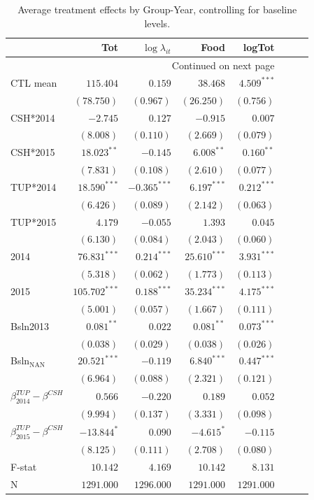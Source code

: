 \documentclass[12pt,article]{article}
\begin{document}
\newpage

\begin{longtable}{lrrrrrrr}
\caption{\label{tab:consumption}Average treatment effects by Group-Year, controlling for baseline levels.}
\\
\hline
 & Tot & $\log\lambda_{it}$ & Food & logTot\\
\hline
\endhead
\hline\multicolumn{5}{r}{Continued on next page} \\
\endfoot
\endlastfoot
CTL mean & $115.404$ & $0.159$ & $38.468$ & $4.509^{***}$\\
 & $(78.750)$ & $(0.967)$ & $(26.250)$ & $(0.756)$\\
\hline
CSH*2014 & $-2.745$ & $0.127$ & $-0.915$ & $0.007$\\
 & $(8.008)$ & $(0.110)$ & $(2.669)$ & $(0.079)$\\
CSH*2015 & $18.023^{**}$ & $-0.145$ & $6.008^{**}$ & $0.160^{**}$\\
 & $(7.831)$ & $(0.108)$ & $(2.610)$ & $(0.077)$\\
TUP*2014 & $18.590^{***}$ & $-0.365^{***}$ & $6.197^{***}$ & $0.212^{***}$\\
 & $(6.426)$ & $(0.089)$ & $(2.142)$ & $(0.063)$\\
TUP*2015 & $4.179$ & $-0.055$ & $1.393$ & $0.045$\\
 & $(6.130)$ & $(0.084)$ & $(2.043)$ & $(0.060)$\\
2014 & $76.831^{***}$ & $0.214^{***}$ & $25.610^{***}$ & $3.931^{***}$\\
 & $(5.318)$ & $(0.062)$ & $(1.773)$ & $(0.113)$\\
2015 & $105.702^{***}$ & $0.188^{***}$ & $35.234^{***}$ & $4.175^{***}$\\
 & $(5.001)$ & $(0.057)$ & $(1.667)$ & $(0.111)$\\
Bsln2013 & $0.081^{**}$ & $0.022$ & $0.081^{**}$ & $0.073^{***}$\\
 & $(0.038)$ & $(0.029)$ & $(0.038)$ & $(0.026)$\\
Bsln$_{\text{NAN}}$ & $20.521^{***}$ & $-0.119$ & $6.840^{***}$ & $0.447^{***}$\\
 & $(6.964)$ & $(0.088)$ & $(2.321)$ & $(0.121)$\\
\hline
$\beta^{TUP}_{2014}-\beta^{CSH}$ & $0.566$ & $-0.220$ & $0.189$ & $0.052$\\
 & $(9.994)$ & $(0.137)$ & $(3.331)$ & $(0.098)$\\
$\beta^{TUP}_{2015}-\beta^{CSH}$ & $-13.844^{*}$ & $0.090$ & $-4.615^{*}$ & $-0.115$\\
 & $(8.125)$ & $(0.111)$ & $(2.708)$ & $(0.080)$\\
\hline
F-stat & $10.142$ & $4.169$ & $10.142$ & $8.131$\\
N & $1291.000$ & $1296.000$ & $1291.000$ & $1291.000$\\
\hline
\end{longtable}
\end{document}
